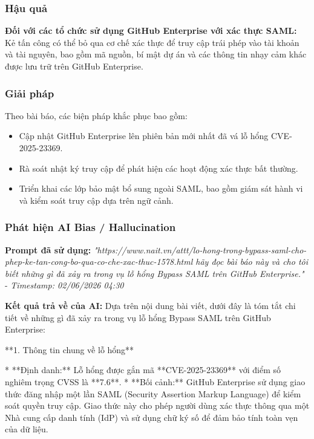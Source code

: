\subsubsection{Hậu quả}
\textbf{Đối với các tổ chức sử dụng GitHub Enterprise với xác thực SAML:} Kẻ tấn công có thể bỏ qua cơ chế xác thực để truy cập trái phép vào tài khoản và tài nguyên, bao gồm mã nguồn, bí mật dự án và các thông tin nhạy cảm khác được lưu trữ trên GitHub Enterprise.

\subsubsection{Giải pháp}
Theo bài báo, các biện pháp khắc phục bao gồm:

\begin{itemize}
    \item Cập nhật GitHub Enterprise lên phiên bản mới nhất đã vá lỗ hổng CVE-2025-23369.
    \item Rà soát nhật ký truy cập để phát hiện các hoạt động xác thực bất thường.
    \item Triển khai các lớp bảo mật bổ sung ngoài SAML, bao gồm giám sát hành vi và kiểm soát truy cập dựa trên ngữ cảnh.
\end{itemize}

\subsubsection{Phát hiện AI Bias / Hallucination}

\textbf{Prompt đã sử dụng:} \textit{"{https://www.nait.vn/attt/lo-hong-trong-bypass-saml-cho-phep-ke-tan-cong-bo-qua-co-che-xac-thuc-1578.html} hãy đọc bài báo này và cho tôi biết những gì đã xảy ra trong vụ lỗ hổng Bypass SAML trên GitHub Enterprise."} - \textit{Timestamp: 02/06/2026 04:30}

\textbf{Kết quả trả về của AI:}
Dựa trên nội dung bài viết, dưới đây là tóm tắt chi tiết về những gì đã xảy ra trong vụ lỗ hổng Bypass SAML trên GitHub Enterprise:

**1. Thông tin chung về lỗ hổng**

* **Định danh:** Lỗ hổng được gắn mã **CVE-2025-23369** với điểm số nghiêm trọng CVSS là **7.6**.
* **Bối cảnh:** GitHub Enterprise sử dụng giao thức đăng nhập một lần SAML (Security Assertion Markup Language) để kiểm soát quyền truy cập. Giao thức này cho phép người dùng xác thực thông qua một Nhà cung cấp danh tính (IdP) và sử dụng chữ ký số để đảm bảo tính toàn vẹn của dữ liệu.

